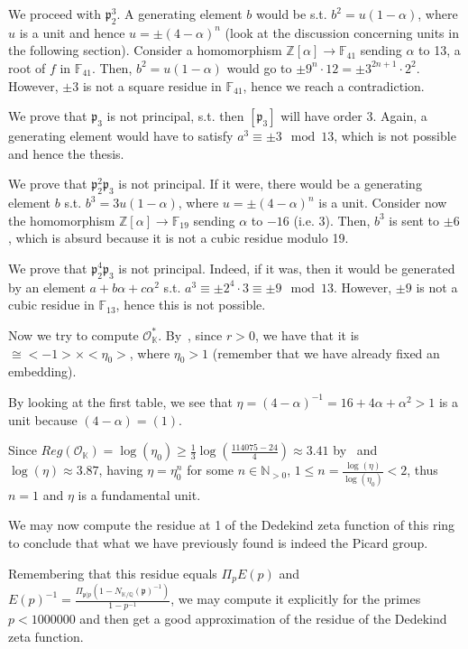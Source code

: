 \documentclass{article}
\newcommand{\numberset}{\mathbb}
\newcommand{\N}{\numberset{N}}
\newcommand{\Z}{\numberset{Z}}
\newcommand{\Q}{\numberset{Q}}
\newcommand{\K}{\numberset{K}}
\newcommand{\F}{\numberset{F}}
\newcommand{\pid}{\mathfrak{p}}
\begin{document}
We proceed with $\pid_2^3$. A generating element $b$ would be s.t. $b^2=u(1-\alpha)$, where $u$ is a unit and hence $u=\pm (4-\alpha)^n$ (look at the discussion concerning units in the following section). Consider a homomorphism $\Z[\alpha]\rightarrow\F_{41}$ sending $\alpha$ to 13, a root of $f$ in $\F_{41}$. Then, $b^2=u(1-\alpha)$ would go to $\pm 9^n\cdot 12=\pm 3^{2n+1}\cdot 2^2$. However, $\pm 3$ is not a square residue in $\F_{41}$, hence we reach a contradiction.

We prove that $\pid_3$ is not principal, s.t. then $[\pid_3]$ will have order 3. Again, a generating element would have to satisfy $a^3\equiv\pm 3\mod 13$, which is not possible and hence the thesis.

We prove that $\pid_2^2\pid_3$ is not principal. If it were, there would be a generating element $b$ s.t. $b^3=3u(1-\alpha)$, where $u=\pm (4-\alpha)^n$ is a unit. Consider now the homomorphism $\Z[\alpha]\rightarrow\F_{19}$ sending $\alpha$ to $-16$ (i.e. 3). Then, $b^3$ is sent to $\pm 6$, which is absurd because it is not a cubic residue modulo 19.

We prove that $\pid_2^4\pid_3$ is not principal. Indeed, if it was, then it would be generated by an element $a+b\alpha+c\alpha^2$ s.t. $a^3\equiv\pm 2^4\cdot3\equiv\pm 9\mod 13$. However, $\pm 9$ is not a cubic residue in $\F_{13}$, hence this is not possible.

Now we try to compute $\mathcal{O}_{\K}^*$. By~\cite[thm. 5.13]{stev}, since $r>0$, we have that it is $\cong<-1>\times<\eta_0>$, where $\eta_0>1$ (remember that we have already fixed an embedding).

By looking at the first table, we see that $\eta=(4-\alpha)^{-1}=16+4\alpha+\alpha^2>1$ is a unit because $(4-\alpha)=(1)$.

Since $Reg(\mathcal{O}_{\K})=\log(\eta_0)\geq\frac{1}{3}\log(\frac{114075-24}{4})\approx 3.41$ by~\cite[ex. 5.21]{stev} and $\log(\eta)\approx 3.87$, having $\eta=\eta_0^n$ for some $n\in\N_{>0}$, $1\leq n=\frac{\log(\eta)}{\log(\eta_0)}<2$, thus $n=1$ and $\eta$ is a fundamental unit.

We may now compute the residue at 1 of the Dedekind zeta function of this ring to conclude that what we have previously found is indeed the Picard group.

Remembering that this residue equals $\Pi_{p} E(p)$ and $E(p)^{-1}=\frac{\Pi_{\pid|p} (1-N_{\K/\Q}(\pid)^{-1})}{1-p^{-1}}$, we may compute it explicitly for the primes $p<1000000$ and then get a good approximation of the residue of the Dedekind zeta function.
\end{document}
